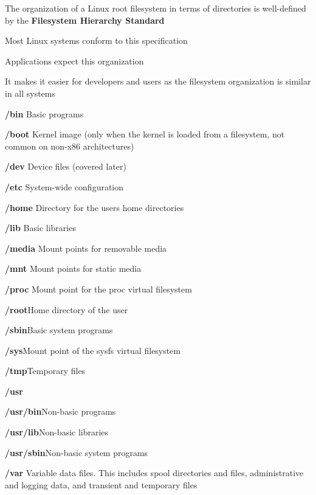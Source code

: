
  \startitemize
  \item The organization of a Linux root filesystem in terms of
    directories is well-defined by the {\bf Filesystem Hierarchy
      Standard}
  \item {}
  \item Most Linux systems conform to this specification
    \startitemize
    \item Applications expect this organization
    \item It makes it easier for developers and users as the
      filesystem organization is similar in all systems
    \stopitemize
  \stopitemize

  \startitemize
  \item{\bf/bin} Basic programs
  \item{\bf/boot} Kernel image (only when the kernel is loaded from a
    filesystem, not common on non-x86 architectures)
  \item{\bf/dev} Device files (covered later)
  \item{\bf/etc} System-wide configuration
  \item{\bf/home} Directory for the users home directories
  \item{\bf/lib} Basic libraries
  \item{\bf/media} Mount points for removable media
  \item{\bf/mnt} Mount points for static media
  \item{\bf/proc} Mount point for the proc virtual filesystem
  \stopitemize

  \startitemize
  \item{\bf/root}Home directory of the  user
  \item{\bf/sbin}Basic system programs
  \item{\bf/sys}Mount point of the sysfs virtual filesystem
  \item{\bf/tmp}Temporary files
  \item{\bf/usr}
    \startitemize
    \item{\bf/usr/bin}Non-basic programs
    \item{\bf/usr/lib}Non-basic libraries
    \item{\bf/usr/sbin}Non-basic system programs
    \stopitemize
  \item{\bf/var} Variable data files. This includes spool directories and
    files, administrative and logging data, and transient and
    temporary files
  \stopitemize

